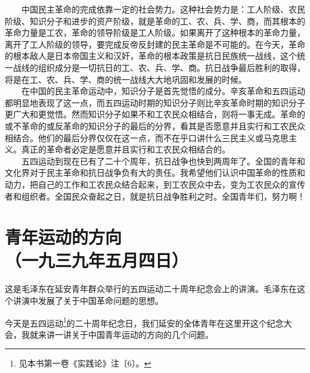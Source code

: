 \documentclass[cn,11pt,chinese]{elegantbook}
\def\myformat#1{\hfil\hfil #1}
\begin{document}
　　中国民主革命的完成依靠一定的社会势力。这种社会势力是：工人阶级、农民阶级、知识分子和进步的资产阶级，就是革命的工、农、兵、学、商，而其根本的革命力量是工农，革命的领导阶级是工人阶级。如果离开了这种根本的革命力量，离开了工人阶级的领导，要完成反帝反封建的民主革命是不可能的。在今天，革命的根本敌人是日本帝国主义和汉奸，革命的根本政策是抗日民族统一战线，这个统一战线的组织成分是一切抗日的工、农、兵、学、商。抗日战争最后胜利的取得，将是在工、农、兵、学、商的统一战线大大地巩固和发展的时候。\\
　　在中国的民主革命运动中，知识分子是首先觉悟的成分。辛亥革命和五四运动都明显地表现了这一点，而五四运动时期的知识分子则比辛亥革命时期的知识分子更广大和更觉悟。然而知识分子如果不和工农民众相结合，则将一事无成。革命的或不革命的或反革命的知识分子的最后的分界，看其是否愿意并且实行和工农民众相结合。他们的最后分界仅仅在这一点，而不在乎口讲什么三民主义或马克思主义。真正的革命者必定是愿意并且实行和工农民众相结合的。\\
　　五四运动到现在已有了二十个周年，抗日战争也快到两周年了。全国的青年和文化界对于民主革命和抗日战争负有大的责任。我希望他们认识中国革命的性质和动力，把自己的工作和工农民众结合起来，到工农民众中去，变为工农民众的宣传者和组织者。全国民众奋起之日，就是抗日战争胜利之时。全国青年们，努力啊！\\
\newpage\section*{\myformat{青年运动的方向}\\\myformat{（一九三九年五月四日）}}
\begin{introduction}\item  这是毛泽东在延安青年群众举行的五四运动二十周年纪念会上的讲演。毛泽东在这个讲演中发展了关于中国革命问题的思想。\end{introduction}
今天是五四运动\footnote[1]{ 见本书第一卷《实践论》注〔6〕。}的二十周年纪念日，我们延安的全体青年在这里开这个纪念大会，我就来讲一讲关于中国青年运动的方向的几个问题。\\
\end{document}
